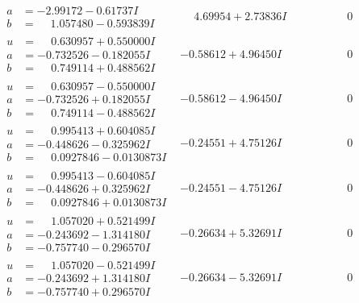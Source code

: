 \documentclass[1p]{elsarticle_modified}
\theoremstyle{definition}
\begin{document}
$$\begin{array}{c|c|c}
\begin{aligned}
a &= -2.99172 - 0.61737 I \\
b &= \phantom{-}1.057480 - 0.593839 I\end{aligned}
 & \phantom{-}4.69954 + 2.73836 I & \phantom{-0.000000 } 0 \\ \hline\begin{aligned}
u &= \phantom{-}0.630957 + 0.550000 I \\
a &= -0.732526 - 0.182055 I \\
b &= \phantom{-}0.749114 + 0.488562 I\end{aligned}
 & -0.58612 + 4.96450 I & \phantom{-0.000000 } 0 \\ \hline\begin{aligned}
u &= \phantom{-}0.630957 - 0.550000 I \\
a &= -0.732526 + 0.182055 I \\
b &= \phantom{-}0.749114 - 0.488562 I\end{aligned}
 & -0.58612 - 4.96450 I & \phantom{-0.000000 } 0 \\ \hline\begin{aligned}
u &= \phantom{-}0.995413 + 0.604085 I \\
a &= -0.448626 - 0.325962 I \\
b &= \phantom{-}0.0927846 - 0.0130873 I\end{aligned}
 & -0.24551 + 4.75126 I & \phantom{-0.000000 } 0 \\ \hline\begin{aligned}
u &= \phantom{-}0.995413 - 0.604085 I \\
a &= -0.448626 + 0.325962 I \\
b &= \phantom{-}0.0927846 + 0.0130873 I\end{aligned}
 & -0.24551 - 4.75126 I & \phantom{-0.000000 } 0 \\ \hline\begin{aligned}
u &= \phantom{-}1.057020 + 0.521499 I \\
a &= -0.243692 - 1.314180 I \\
b &= -0.757740 - 0.296570 I\end{aligned}
 & -0.26634 + 5.32691 I & \phantom{-0.000000 } 0 \\ \hline\begin{aligned}
u &= \phantom{-}1.057020 - 0.521499 I \\
a &= -0.243692 + 1.314180 I \\
b &= -0.757740 + 0.296570 I\end{aligned}
 & -0.26634 - 5.32691 I & \phantom{-0.000000 } 0\\

\end{array}$$
\end{document}
